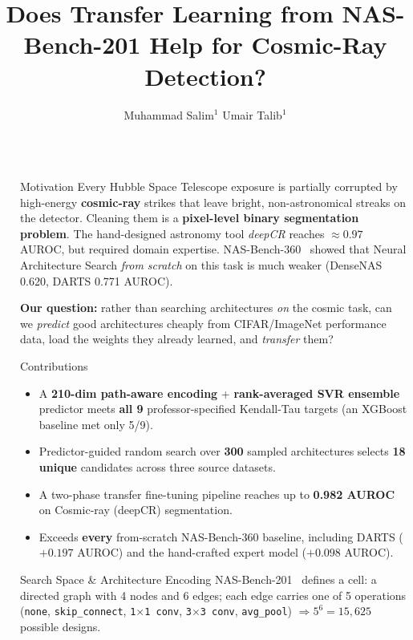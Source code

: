 \documentclass[final]{beamer}
\title{Does Transfer Learning from NAS-Bench-201 Help for Cosmic-Ray Detection?}
\author{Muhammad Salim$^{1}$ \quad Umair Talib$^{1}$}
\institute[shortinst]{\small{$^1$ University of Siegen, Visual Computing Group \quad
Supervisor: Jun.-Prof.\ Dr.\ Jovita Lukasik}%
}
\newlength{\sepwidth}
\newlength{\colwidth}
\newcommand{\separatorcolumn}{\begin{column}{\sepwidth}\end{column}}
\begin{document}
\begin{frame}[t]
\begin{columns}[t]
\separatorcolumn

\begin{column}{\colwidth}

  \begin{block}{Motivation}
    Every Hubble Space Telescope exposure is partially corrupted by
    high-energy \textbf{cosmic-ray} strikes that leave bright,
    non-astronomical streaks on the detector. Cleaning them is a
    \textbf{pixel-level binary segmentation problem}. The hand-designed
    astronomy tool \emph{deepCR} reaches $\approx 0.97$ AUROC, but required
    domain expertise. NAS-Bench-360~\citep{tu2022nasbench360} showed that
    Neural Architecture Search \emph{from scratch} on this task is much
    weaker (DenseNAS 0.620, DARTS 0.771 AUROC).

    \textbf{Our question:} rather than searching architectures \emph{on}
    the cosmic task, can we \emph{predict} good architectures cheaply from
    CIFAR/ImageNet performance data, load the weights they already
    learned, and \emph{transfer} them?
  \end{block}

  \begin{alertblock}{Contributions}
    \begin{itemize}
      \item A \textbf{210-dim path-aware encoding} + \textbf{rank-averaged
        SVR ensemble} predictor meets \textbf{all 9} professor-specified
        Kendall-Tau targets (an XGBoost baseline met only 5/9).
      \item Predictor-guided random search over \textbf{300} sampled
        architectures selects \textbf{18 unique} candidates across three
        source datasets.
      \item A two-phase transfer fine-tuning pipeline reaches up to
        \textbf{0.982 AUROC} on Cosmic-ray (deepCR) segmentation.
      \item Exceeds \textbf{every} from-scratch NAS-Bench-360 baseline,
        including DARTS ($+0.197$ AUROC) and the hand-crafted expert
        model ($+0.098$ AUROC).
    \end{itemize}
  \end{alertblock}

  \begin{block}{Search Space \& Architecture Encoding}
    NAS-Bench-201~\citep{dong2020nasbench201} defines a cell: a directed
    graph with 4 nodes and 6 edges; each edge carries one of 5 operations
    (\texttt{none}, \texttt{skip\_connect}, \texttt{1$\times$1 conv},
    \texttt{3$\times$3 conv}, \texttt{avg\_pool}) $\Rightarrow 5^6 =
    15{,}625$ possible designs.


\end{block}
\end{column}
\end{columns}
\end{frame}
\end{document}
